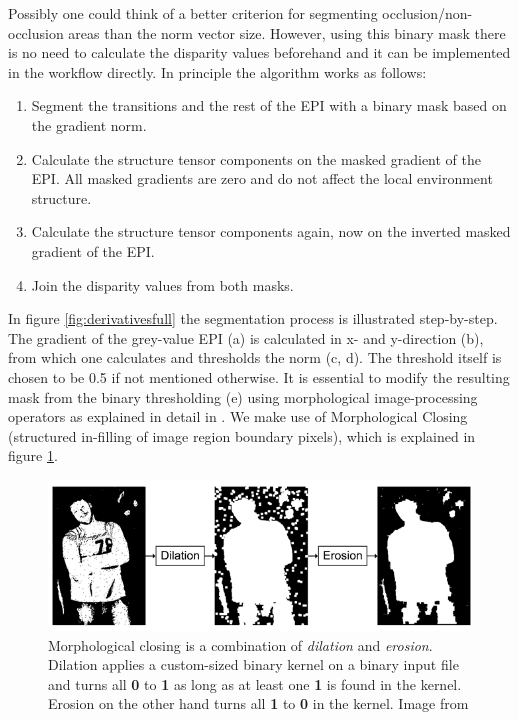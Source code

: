 \documentclass  [
  paper    = a4,
  BCOR     = 10mm,
  twoside,
  fontsize = 12pt,
  fleqn,
  toc      = bibnumbered,
  toc      = listofnumbered,
  numbers  = noendperiod,
  headings = normal,
  listof   = leveldown,
  version  = 3.03
]                                       {scrreprt}
\begin{document}
 Possibly one could think of a better criterion for segmenting occlusion/non-occlusion areas than the norm vector size. However, using this binary mask there is no need to calculate the disparity values beforehand and it can be implemented in the workflow directly. In principle the algorithm works as follows:
 \begin{enumerate}
 	\item Segment the transitions and the rest of the EPI with a binary mask based on the gradient norm.
 	\item Calculate the structure tensor components on the masked gradient of the EPI. All masked gradients are zero and do not affect the local environment structure.
 	\item Calculate the structure tensor components again, now on the inverted masked gradient of the EPI.
 	\item Join the disparity values from both masks.
 \end{enumerate}
 In figure \ref{fig:derivativesfull} the segmentation process is illustrated step-by-step. The gradient of the grey-value EPI (a) is calculated in x- and y-direction (b), from which one calculates and thresholds the norm (c, d). The threshold itself is chosen to be 0.5 if not mentioned otherwise. It is essential to modify the resulting mask from the binary thresholding (e) using morphological image-processing operators as explained in detail in \cite{homepages.inf.ed.ac.uk}. We make use of Morphological Closing (structured in-filling of image region boundary pixels), which is explained in figure \ref{fig:closing}.
 \begin{figure}[h!]
 	\centering
 	\includegraphics[width=0.7\linewidth]{images/closing}
 	\caption[Morphological closing]{Morphological closing is a combination of \textit{dilation} and \textit{erosion}. Dilation applies a custom-sized binary kernel on a binary input file and turns all \textbf{0} to \textbf{1} as long as at least one \textbf{1} is found in the kernel. Erosion on the other hand turns all \textbf{1} to \textbf{0} in the kernel. Image from \cite{what-when-how.com}}
 	\label{fig:closing}
 \end{figure}
\end{document}

